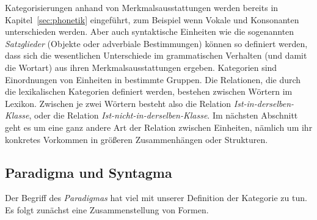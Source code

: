 
Kategorisierungen anhand von Merkmalsausstattungen werden bereits in Kapitel~\ref{sec:phonetik} eingeführt, zum Beispiel wenn Vokale und Konsonanten unterschieden werden.
Aber auch syntaktische Einheiten wie die sogenannten \textit{Satzglieder} (\zB Objekte oder adverbiale Bestimmungen) können so definiert werden, dass sich die wesentlichen Unterschiede im grammatischen Verhalten (und damit die Wortart) aus ihren Merkmalsausstattungen ergeben.
Kategorien sind Einordnungen von Einheiten in bestimmte Gruppen.
Die Relationen, die durch die lexikalischen Kategorien definiert werden, bestehen zwischen Wörtern im Lexikon.
Zwischen je zwei Wörtern besteht also die Relation \textit{Ist-in-derselben-Klasse}, oder die Relation \textit{Ist-nicht-in-derselben-Klasse}.
Im nächsten Abschnitt geht es um eine ganz andere Art der Relation zwischen Einheiten, nämlich um ihr konkretes Vorkommen in größeren Zusammenhängen oder Strukturen.

\subsection{Paradigma und Syntagma}
\label{sec:paradigmaundsyntagma}

Der Begriff des \textit{Paradigmas} hat viel mit unserer Definition der Kategorie zu tun.
Es folgt zunächst eine Zusammenstellung von Formen.

\begin{exe}
  \ex\label{ex:paradigmaundsyntagma004}
  \begin{xlist}
  \end{xlist}
  \ex\label{ex:paradigmaundsyntagma005}
  \begin{xlist}
  \end{xlist}
  \ex\label{ex:paradigmaundsyntagma006}
  \begin{xlist}
  \end{xlist}
  \ex\label{ex:paradigmaundsyntagma007}
  \begin{xlist}
  \end{xlist}
  \ex\label{ex:paradigmaundsyntagma008}
  \begin{xlist}
  \end{xlist}
\end{exe}

